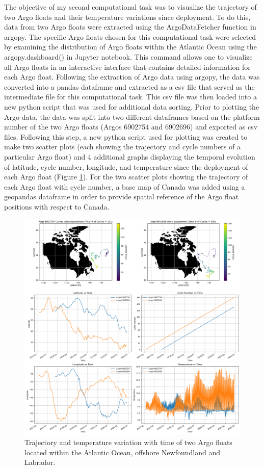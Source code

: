 \documentclass{article}
\begin{document}
The objective of my second computational task was to visualize the trajectory of two Argo floats and their temperature variations since deployment. To do this, data from two Argo floats were extracted using the ArgoDataFetcher function in argopy. The specific Argo floats chosen for this computational task were selected by examining the distribution of Argo floats within the Atlantic Ocean using the argopy.dashboard() in Jupyter notebook. This command allows one to visualize all Argo floats in an interactive interface that contains detailed information for each Argo float. Following the extraction of Argo data using argopy, the data was converted into a pandas dataframe and extracted as a csv file that served as the intermediate file for this computational task. This csv file was then loaded into a new python script that was used for additional data sorting. Prior to plotting the Argo data, the data was split into two different dataframes based on the platform number of the two Argo floats (Argos 6902754 and 6902696) and exported as csv files. Following this step, a new python script used for plotting was created to make two scatter plots (each showing the trajectory and cycle numbers of a particular Argo float) and 4 additional graphs displaying the temporal evolution of latitude, cycle number, longitude, and temperature since the deployment of each Argo float (Figure \ref{fig:task 2}). For the two scatter plots showing the trajectory of each Argo float with cycle number, a base map of Canada was added using a geopandas dataframe in order to provide spatial reference of the Argo float positions with respect to Canada.

\begin{figure}[H]
\includegraphics[width=\textwidth,height=\textheight,keepaspectratio]{argo_trajectory.png}
\caption{Trajectory and temperature variation with time of two Argo floats located within the Atlantic Ocean, offshore Newfoundland and Labrador.}
\label{fig:task 2}
\end{figure}
 
\end{document}
